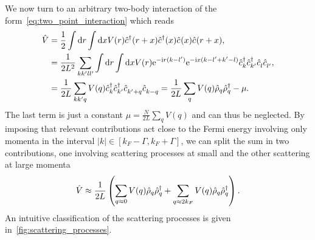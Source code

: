 We now turn to an arbitrary two-body interaction of the form~\cref{eq:two_point_interaction} which reads
\begin{align}
    \hat V
    &= \frac12\int\rd r\int\rd x V(r)\hat c^\dag(r+x)\hat c^\dag(x)\hat c^\pdag(x)\hat c^\pdag(r+x),
    \\
    &= \frac1{2L^2}\sum_{kk'll'}\int\rd r\int\rd x V(r)\re^{-\ri r(k-l')}\re^{-\ri x(k-l'+k'-l)}\hat c^\dag_k\hat c^\dag_{k'}\hat c^\pdag_l\hat c^\pdag_{l'},
    \\
    &= \frac1{2L}\sum_{kk'q}V(q)\hat c^\dag_k\hat c^\dag_{k'}\hat c^\pdag_{k'+q}\hat c^\pdag_{k-q}
    = \frac1{2L}\sum_{q}V(q)\hat\rho_q\hat\rho^\dag_{q} - \mu.
    \label{eq:two_body_interaction_momentum_space}
\end{align}
The last term is just a constant $\mu = \frac N{2L}\sum_qV(q)$ and can thus be neglected.
By imposing that relevant contributions act close to the Fermi energy involving only momenta in the interval $|k|\in[k_F-\Gamma,k_F+\Gamma]$, we can split the sum in two contributions, one involving scattering processes at small and the other scattering at large momenta
\begin{align}
    \hat V \approx \frac1{2L}\left( \sum_{q\approx0}V(q)\hat\rho_{q}\hat\rho^\dag_{q} + \sum_{q\approx2k_F}V(q)\hat\rho_{q}\hat\rho^\dag_{q} \right).
\end{align}
An intuitive classification of the scattering processes is given in~\cref{fig:scattering_processes}.
